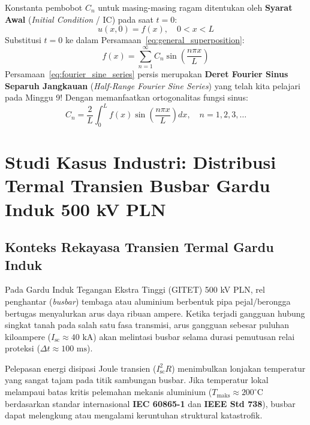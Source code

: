 \documentclass[11pt,a4paper]{article}
\theoremstyle{definition}
\begin{document}
Konstanta pembobot $C_n$ untuk masing-masing ragam ditentukan oleh \textbf{Syarat Awal} (\textit{Initial Condition} / IC) pada saat $t = 0$:
\begin{equation}
    u(x, 0) = f(x), \quad 0 < x < L
    \label{eq:initial_condition}
\end{equation}
Substitusi $t = 0$ ke dalam Persamaan~\eqref{eq:general_superposition}:
\begin{equation}
    f(x) = \sum_{n=1}^{\infty} C_n \sin\left(\frac{n \pi x}{L}\right)
    \label{eq:fourier_sine_series}
\end{equation}
Persamaan~\eqref{eq:fourier_sine_series} persis merupakan \textbf{Deret Fourier Sinus Separuh Jangkauan} (\textit{Half-Range Fourier Sine Series}) yang telah kita pelajari pada Minggu 9! Dengan memanfaatkan ortogonalitas fungsi sinus:
\begin{equation}
    C_n = \frac{2}{L} \int_{0}^{L} f(x) \sin\left(\frac{n \pi x}{L}\right) dx, \quad n = 1, 2, 3, \dots
    \label{eq:cn_formula_sine}
\end{equation}

\section{Studi Kasus Industri: Distribusi Termal Transien Busbar Gardu Induk 500 kV PLN}

\subsection{Konteks Rekayasa Transien Termal Gardu Induk}
Pada Gardu Induk Tegangan Ekstra Tinggi (GITET) 500 kV PLN, rel penghantar (\textit{busbar}) tembaga atau aluminium berbentuk pipa pejal/berongga bertugas menyalurkan arus daya ribuan ampere. Ketika terjadi gangguan hubung singkat tanah pada salah satu fasa transmisi, arus gangguan sebesar puluhan kiloampere ($I_{\text{sc}} \approx 40\text{ kA}$) akan melintasi busbar selama durasi pemutusan relai proteksi ($\Delta t \approx 100\text{ ms}$).

Pelepasan energi disipasi Joule transien ($I_{\text{sc}}^2 R$) menimbulkan lonjakan temperatur yang sangat tajam pada titik sambungan busbar. Jika temperatur lokal melampaui batas kritis pelemahan mekanis aluminium ($T_{\text{maks}} \approx 200^\circ\text{C}$ berdasarkan standar internasional \textbf{IEC 60865-1} dan \textbf{IEEE Std 738}), busbar dapat melengkung atau mengalami keruntuhan struktural katastrofik.
\end{document}
